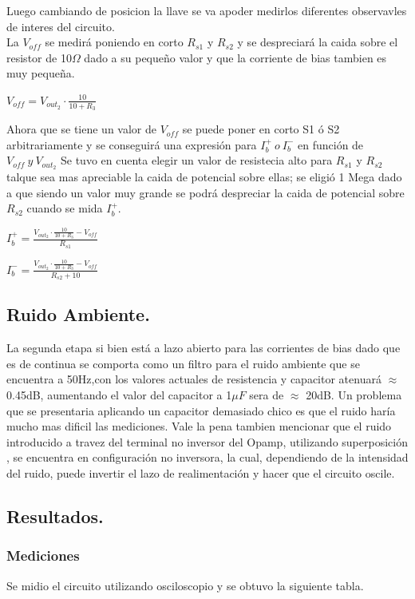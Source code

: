 Luego cambiando de posicion la llave se va apoder medirlos diferentes observavles de interes del circuito.\\
La $V_{off}$ se medirá poniendo en corto $R_{s1}$ y $R_{s2}$ y se despreciará la caida sobre el resistor de 10$\Omega$ dado a su pequeño valor y que la corriente de bias tambien es muy pequeña.\\
\begin{center}$V_{off}=V_{out_2} \cdot \frac{10}{10+R_3} $\end{center}
Ahora que se tiene un valor de $V_{off}$ se  puede poner en corto S1 ó S2 arbitrariamente y se conseguirá una expresión para $ I_b^+ \ o \  I_b^-$ en función de $V_{off} \ y \ V_{out_2}$
Se tuvo en cuenta elegir un valor de resistecia alto para $R_{s1}$ y $R_{s2}$ talque sea mas apreciable la caida de potencial sobre ellas; se eligió 1 Mega dado a que siendo un valor muy grande se podrá despreciar la caida de potencial sobre $R_{s2}$  cuando se mida $I_b^+$.\\
\begin{center}$I_b^+=\frac{V_{out_2} \cdot \frac{10}{10+R_3}-V_{off}}{R_{s1}}$\end{center}
\begin{center}$I_b^-=\frac{V_{out_2} \cdot \frac{10}{10+R_3}-V_{off}}{R_{s2}+10}$\end{center}

\subsection{Ruido Ambiente.}
La segunda etapa si bien está a lazo abierto para las corrientes de bias dado que es de continua se comporta como un filtro para el ruido ambiente que se encuentra a 50Hz,con los valores actuales de resistencia y capacitor atenuará $\approx$ 0.45dB, aumentando el valor del capacitor a 1$\mu F$ sera de  $\approx$ 20dB.
Un problema que se presentaria aplicando un capacitor demasiado chico es que el ruido haría mucho mas dificil las mediciones.
Vale la pena tambien mencionar que el ruido introducido a travez del terminal no inversor del Opamp, utilizando superposición , se encuentra en configuración no inversora, la cual, dependiendo de la intensidad del ruido, puede invertir el lazo de realimentación y hacer que el circuito oscile.
\subsection{Resultados.}
\subsubsection{Mediciones}
Se midio el circuito utilizando osciloscopio y se  obtuvo la siguiente tabla.



